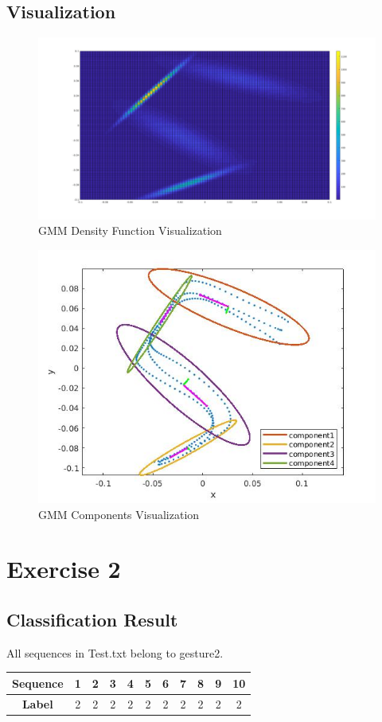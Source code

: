 \documentclass{article}
\begin{document}
\subsection{Visualization}
\begin{figure}[!ht]
	\centering
	\includegraphics[width=1\linewidth]{1_3D.jpg} 
	\caption{GMM Density Function Visualization} 
\end{figure}
\newpage
\begin{figure}[ht]
	\centering
	\includegraphics[width=0.8\linewidth]{1_2D.jpg} 
	\caption{GMM Components Visualization}  
\end{figure}


\newpage

\section{Exercise 2}
\subsection{Classification Result}
All sequences in Test.txt belong to gesture2.
\begin{center}
	\begin{tabular}{ c | c | c | c | c | c | c | c | c |c |c }
		\hline
		\textbf{Sequence} &1 & 2 &3 & 4&5 & 6&7 & 8&9 & 10\\
		\hline		
		\textbf{Label}  &2 & 2 &2 & 2&2 & 2&2 & 2&2 & 2 \\ \hline
	\end{tabular}
\end{center}
\end{document}
